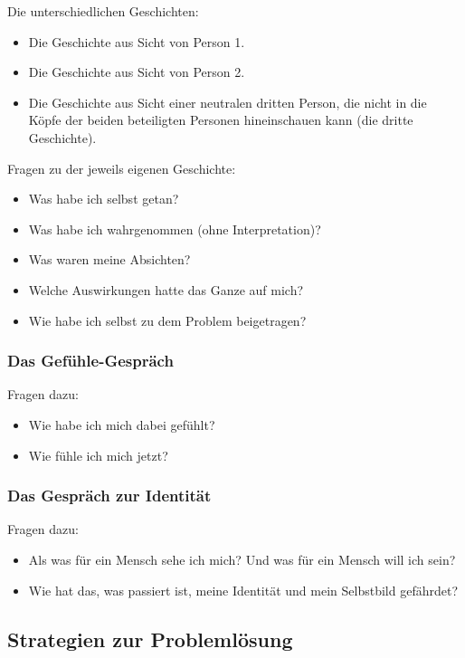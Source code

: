 Die unterschiedlichen Geschichten:

\begin{itemize}
  \item Die Geschichte aus Sicht von Person 1.
  \item Die Geschichte aus Sicht von Person 2.
  \item Die Geschichte aus Sicht einer neutralen dritten Person, die nicht in die Köpfe der beiden beteiligten Personen hineinschauen kann (\glqq die dritte Geschichte\grqq).
\end{itemize}

Fragen zu der jeweils eigenen Geschichte:

\begin{itemize}
  \item Was habe ich selbst getan?
  \item Was habe ich wahrgenommen (ohne Interpretation)?
  \item Was waren meine Absichten?
  \item Welche Auswirkungen hatte das Ganze auf mich?
  \item Wie habe ich selbst zu dem Problem beigetragen?
\end{itemize}


\subsubsection{Das Gefühle-Gespräch}

Fragen dazu:

\begin{itemize}
  \item Wie habe ich mich dabei gefühlt?
  \item Wie fühle ich mich jetzt?
\end{itemize}

\subsubsection{Das Gespräch zur Identität}

Fragen dazu:

\begin{itemize}
  \item Als was für ein Mensch sehe ich mich? Und was für ein Mensch will ich sein?
  \item Wie hat das, was passiert ist, meine Identität und mein Selbstbild gefährdet?
\end{itemize}


\subsection{Strategien zur Problemlösung}

